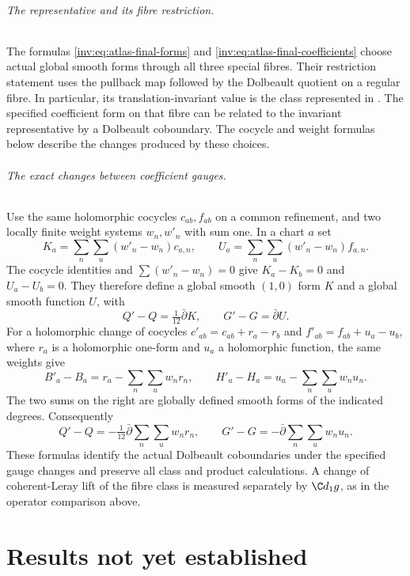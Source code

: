 \paragraph{The representative and its fibre restriction.}
\label{wb:rem:bcpr-literal-gauge}
The formulas \eqref{inv:eq:atlas-final-forms} and
\eqref{inv:eq:atlas-final-coefficients} choose actual global smooth
forms through all three special fibres.  Their restriction statement
uses the pullback map followed by the Dolbeault quotient on a regular
fibre.  In particular, its translation-invariant value is the class
represented in .
The specified coefficient form on that fibre can be related to the
invariant representative by a Dolbeault coboundary.  The cocycle and
weight formulas below describe the changes produced by these choices.


\paragraph{The exact changes between coefficient gauges.}
\label{wb:rem:bcpr-global-gauge-boundary}
Use the same holomorphic cocycles $c_{ab},f_{ab}$ on a common
refinement, and two locally finite weight systems $w_n,w'_n$ with
sum one.  In a chart $a$ set
\[
 K_a=\sum_n\sum_u(w'_n-w_n)c_{a,n},\qquad
 U_a=\sum_n\sum_u(w'_n-w_n)f_{a,n}.
\]
The cocycle identities and $\sum(w'_n-w_n)=0$ give
$K_a-K_b=0$ and $U_a-U_b=0$.  They therefore define a global
smooth $(1,0)$ form $K$ and a global smooth function $U$, with
\[
 Q'-Q=\tfrac1{12}\bar\partial K,\qquad
 G'-G=\bar\partial U.
\]
For a holomorphic change of cocycles
$c'_{ab}=c_{ab}+r_a-r_b$ and
$f'_{ab}=f_{ab}+u_a-u_b$, where $r_a$ is a holomorphic one-form
and $u_a$ a holomorphic function, the same weights give
\[
 B'_a-B_a=r_a-\sum_n\sum_u w_n r_n,\qquad
 H'_a-H_a=u_a-\sum_n\sum_u w_n u_n.
\]
The two sums on the right are globally defined smooth forms of the
indicated degrees.  Consequently
\[
 Q'-Q=-\tfrac1{12}\bar\partial\!\sum_n\sum_u w_n r_n,
 \qquad
 G'-G=-\bar\partial\!\sum_n\sum_u w_n u_n.
\]
These formulas identify the actual Dolbeault coboundaries under the
specified gauge changes and preserve all class and product
calculations.  A change of coherent-Leray lift of the fibre class is
measured separately by $\C d_1g$, as in the operator comparison above.


\clearpage
\part{Results not yet established}
